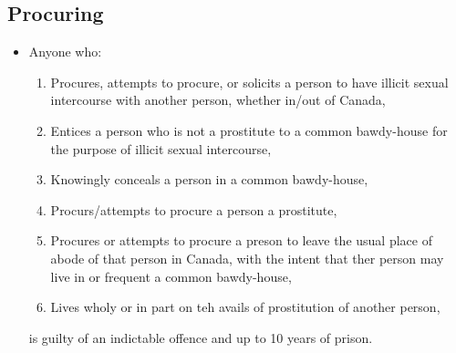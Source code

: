 \documentclass{article}
\begin{document}
\subsection{Procuring}
\begin{itemize}
    \item Anyone who:
        \begin{enumerate}
            \item Procures, attempts to procure, or solicits a person to have illicit sexual intercourse with another person, whether in/out of Canada,
            \item Entices a person who is not a prostitute to a common bawdy-house for the purpose of illicit sexual intercourse,
            \item Knowingly conceals a person in a common bawdy-house,
            \item Procurs/attempts to procure a person a prostitute,
            \item Procures or attempts to procure a preson to leave the usual place of abode of that person in Canada, with the intent that ther person may live in or frequent a common bawdy-house,
            \item Lives wholy or in part on teh avails of prostitution of another person,
        \end{enumerate}
        is guilty of an indictable offence and up to 10 years of prison.
\end{itemize}
\end{document}
